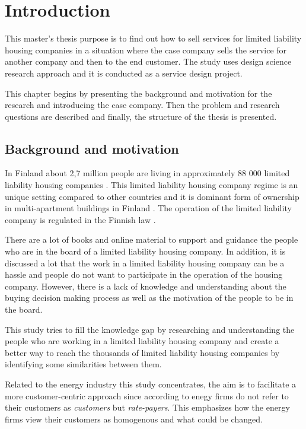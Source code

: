 \chapter{Introduction}
\label{chapter:intro}

This master's thesis purpose is to find out how to sell services for limited liability housing companies in a situation where the case company sells the service for another company and then to the end customer. The study uses design science research approach and it is conducted as a service design project.

This chapter begins by presenting the background and motivation for the research and introducing the case company. Then the problem and research questions are described and finally, the structure of the thesis is presented.

\section{Background and motivation}

In Finland about 2,7 million people are living in approximately 88 000 limited liability housing companies \parencite{REMF, Stats}. This limited liability housing company regime is an unique setting compared to other countries and it is dominant form of ownership in multi-apartment buildings in Finland \parencite{Lujanen:2017}. The operation of the limited liability company is regulated in the Finnish law \parencite{YIT}.

There are a lot of books and online material to support and guidance the people who are in the board of a limited liability housing company. In addition, it is discussed a lot that the work in a limited liability housing company can be a hassle and people do not want to participate in the operation of the housing company. However, there is a lack of knowledge and understanding about the buying decision making process as well as the motivation of the people to be in the board.

This study tries to fill the knowledge gap by researching and understanding the people who are working in a limited liability housing company and create a better way to reach the thousands of limited liability housing companies by identifying some similarities between them.

Related to the energy industry this study concentrates, the aim is to facilitate a more customer-centric approach since according to \textcite{Fader:2012} enegy firms do not refer to their customers as \emph{customers} but \emph{rate-payers}. This emphasizes how the energy firms view their customers as homogenous and what could be changed.

